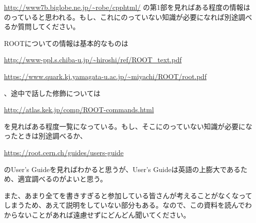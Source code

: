 \documentclass[10pt]{ujarticle}
\begin{document}
\url{http://www7b.biglobe.ne.jp/~robe/cpphtml/}
の第1部を見ればある程度の情報はのっていると思われる。もし、これにのっていない知識が必要になれば別途調べるか質問してください。

ROOTについての情報は基本的なものは

\url{http://www-ppl.s.chiba-u.jp/~hiroshi/ref/ROOT_text.pdf}

\url{https://www.quark.kj.yamagata-u.ac.jp/~miyachi/ROOT/root.pdf}

、途中で話した修飾については

\url{http://atlas.kek.jp/comp/ROOT-commands.html}　

を見ればある程度一覧になっている。もし、そこにのっていない知識が必要になったときは別途調べるか、

\url{https://root.cern.ch/guides/users-guide}

のUser's Guideを見ればわかると思うが、User's Guideは英語の上膨大であるため、適宜調べるのがよいと思う。

また、あまり全てを書きすぎると参加している皆さんが考えることがなくなってしまうため、あえて説明をしていない部分もある。なので、この資料を読んでわからないことがあれば遠慮せずにどんどん聞いてください。
\end{document}
